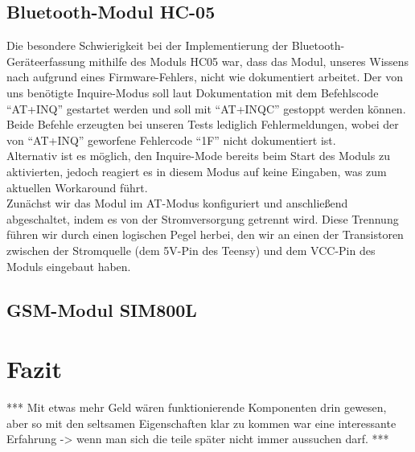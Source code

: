 \documentclass[a4paper,11pt, ngerman]{scrartcl}
\begin{document}
\subsection{Bluetooth-Modul HC-05}
Die besondere Schwierigkeit bei der Implementierung der Bluetooth-Geräteerfassung mithilfe des Moduls HC05 war, dass das Modul, unseres Wissens nach aufgrund eines Firmware-Fehlers, nicht wie dokumentiert arbeitet. Der von uns benötigte Inquire-Modus soll laut Dokumentation mit dem Befehlscode \enquote{AT+INQ} gestartet werden und soll mit \enquote{AT+INQC} gestoppt werden können. Beide Befehle erzeugten bei unseren Tests lediglich Fehlermeldungen, wobei der von \enquote{AT+INQ} geworfene Fehlercode \enquote{1F} nicht dokumentiert ist.\\
Alternativ ist es möglich, den Inquire-Mode bereits beim Start des Moduls zu aktivierten, jedoch reagiert es in diesem Modus auf keine Eingaben, was zum aktuellen Workaround führt.\\
Zunächst wir das Modul im AT-Modus konfiguriert und anschließend abgeschaltet, indem es von der Stromversorgung getrennt wird. Diese Trennung führen wir durch einen logischen Pegel herbei, den wir an einen der Transistoren zwischen der Stromquelle (dem 5V-Pin des Teensy) und dem VCC-Pin des Moduls eingebaut haben.
\subsection{GSM-Modul SIM800L}
\section{Fazit}
*** Mit etwas mehr Geld wären funktionierende Komponenten drin gewesen, aber so mit den seltsamen Eigenschaften klar zu kommen war eine interessante Erfahrung -> wenn man sich die teile später nicht immer aussuchen darf. ***
\nocite{*}
\end{document}

